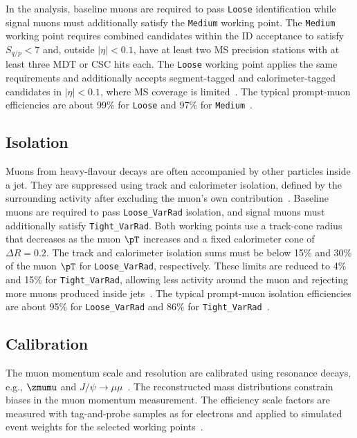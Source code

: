 In the analysis, baseline muons are required to pass \texttt{Loose} identification while signal muons must additionally satisfy the \texttt{Medium} working point.
The \texttt{Medium} working point requires combined candidates within the ID acceptance to satisfy $S_{q/p}<7$ and, outside $|\eta|<0.1$, have at least two MS precision stations with at least three MDT or CSC hits each.
The \texttt{Loose} working point applies the same requirements and additionally accepts segment-tagged and calorimeter-tagged candidates in $|\eta|<0.1$, where MS coverage is limited~\cite{ATLAS2021MuonID}.
The typical prompt-muon efficiencies are about 99\% for \texttt{Loose} and 97\% for \texttt{Medium}~\cite{ATLAS2021MuonID}.

\subsection{Isolation}

Muons from heavy-flavour decays are often accompanied by other particles inside a jet.
They are suppressed using track and calorimeter isolation, defined by the surrounding activity after excluding the muon's own contribution~\cite{ATLAS2021MuonID}.
Baseline muons are required to pass \texttt{Loose\_VarRad} isolation, and signal muons must additionally satisfy \texttt{Tight\_VarRad}.
Both working points use a track-cone radius that decreases as the muon $\pT$ increases and a fixed calorimeter cone of $\Delta R=0.2$.
The track and calorimeter isolation sums must be below 15\% and 30\% of the muon $\pT$ for \texttt{Loose\_VarRad}, respectively.
These limits are reduced to 4\% and 15\% for \texttt{Tight\_VarRad}, allowing less activity around the muon and rejecting more muons produced inside jets~\cite{ATLAS2021MuonID}.
The typical prompt-muon isolation efficiencies are about 95\% for \texttt{Loose\_VarRad} and 86\% for \texttt{Tight\_VarRad}~\cite{ATLAS2024MuonIsolation}.

\subsection{Calibration}

The muon momentum scale and resolution are calibrated using resonance decays, e.g., $\zmumu$ and $J/\psi\rightarrow\mu\mu$~\cite{ATLAS2023MuonCalibration}.
The reconstructed mass distributions constrain biases in the muon momentum measurement.
The efficiency scale factors are measured with tag-and-probe samples as for electrons and applied to simulated event weights for the selected working points~\cite{ATLAS2021MuonID}.
